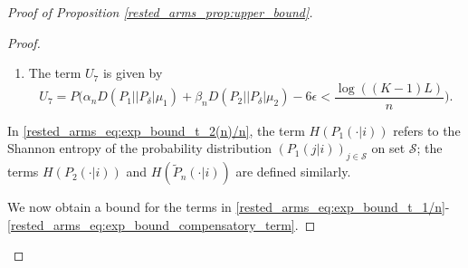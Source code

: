 \begin{proof}[Proof of Proposition \ref{rested_arms_prop:upper_bound}]
\begin{proof}
\begin{enumerate}
    where $P_\delta$ is the probability transition matrix described in the statement of Proposition \ref{rested_arms_prop:lim_M_h(n)/n_correct_drift}.
    \item The term $U_7$ is given by
    \begin{equation}
    	U_7=P\bigg(\alpha_n D(P_1||P_\delta|\mu_1)+\beta_n D(P_2||P_\delta|\mu_2)-6\epsilon
	<\frac{\log((K-1)L)}{n}\bigg).\label{rested_arms_eq:exp_bound_compensatory_term}
    \end{equation}
\end{enumerate}
In \eqref{rested_arms_eq:exp_bound_t_2(n)/n}, the term $H(P_1(\cdot|i))$ refers to the Shannon entropy of the probability distribution $(P_1(j|i))_{j\in\mathcal{S}}$ on set $\mathcal{S}$;
the terms $H(P_2(\cdot|i))$ and $H(\tilde{P}_n(\cdot|i))$ are defined similarly.

We now obtain a bound for the terms in \eqref{rested_arms_eq:exp_bound_t_1/n}-\eqref{rested_arms_eq:exp_bound_compensatory_term}.


\end{proof}
\end{proof}
